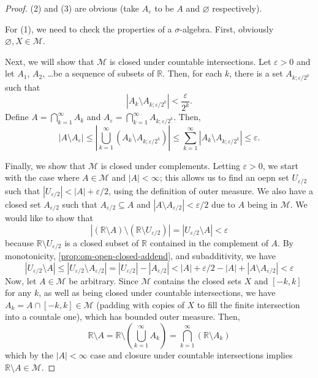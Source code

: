 \documentclass[11pt]{scrartcl}
\providecommand{\eps}{\varepsilon}
\providecommand{\RR}{\mathbb R}
\providecommand{\abs}[1]{\left\lvert #1\right\rvert}
\begin{document}
\begin{proof}
    (2) and (3) are obvious (take $A_\eps$ to be $A$ and $\varnothing$ respectively).

    For (1), we need to check the properties of a $\sigma$-algebra.
    First, obviously $\varnothing, X\in\mathcal M$.
    
    Next, we will show that $\mathcal M$ is closed under countable intersections.
    Let $\eps>0$ and let $A_1$, $A_2$, \dots be a sequence of subsets of $\RR$.
    Then, for each $k$, there is a set $A_{k;\eps/2^k}$ such that
    \begin{equation*}
	\abs{A_k\setminus A_{k;\eps/2^k}} < \frac\eps{2^k}.
    \end{equation*}
    Define $A = \bigcap_{k=1}^\infty A_k$ and
    $A_\eps=\bigcap_{k=1}^\infty A_{k;\eps/2^k}$. Then,
    \begin{equation*}
	\abs{A\setminus A_\eps}
	\le \abs{\bigcup_{k=1}^\infty (A_k\setminus A_{k;\eps/2^k})} \le
	\sum_{k=1}^\infty\abs{A_k\setminus A_{k;\eps/2^k}}\le\eps.
    \end{equation*}

    Finally, we show that $\mathcal M$ is closed under complements.
    Letting $\eps > 0$, we start with the case where $A\in\mathcal M$
    and $\abs A < \infty$; this allows us to find an oepn set
    $U_{\eps/2}$ such that $\abs{U_{\eps/2}} < \abs A + \eps/2$,
    using the definition of outer measure.
    We also have a closed set $A_{\eps/2}$ such that
    $A_{\eps/2}\subseteq A$ and $\abs{A\setminus A_{\eps/2}} < \eps/2$
    due to $A$ being in $\mathcal M$. We would like to show that
    \begin{equation*}
	\abs{(\RR\setminus A)\setminus(\RR\setminus U_{\eps/2})}
	= \abs{U_{\eps/2}\setminus A} < \eps
    \end{equation*}
    because $\RR\setminus U_{\eps/2}$ is a closed subset of $\RR$
    contained in the complement of $A$.
    By monotonicity, \autoref{prop:om-open-closed-addend},
    and subadditivity, we have
    \begin{equation*}
	\abs{U_{\eps/2}\setminus A} \le
	\abs{U_{\eps/2}\setminus A_{\eps/2}} =
	\abs{U_{\eps/2}}-\abs{A_{\eps/2}} <
	\abs A + \eps/2 - \abs A + \abs{A\setminus A_{\eps/2}} < \eps
    \end{equation*}
    Now, let $A\in\mathcal M$ be arbitrary.
    Since $\mathcal M$ contains the closed sets $X$ and $[-k,k]$
    for any $k$, as well as being closed under countable intersections,
    we have $A_k = A\cap[-k,k]\in\mathcal M$
    (padding with copies of $X$ to fill
    the finite intersection into a countale one),
    which has bounded outer measure. Then,
    \begin{equation*}
	\RR\setminus A = \RR\setminus\left(\bigcup_{k=1}^\infty A_k\right) =
    \bigcap_{k=1}^\infty(\RR\setminus A_k)
    \end{equation*}
    which by the $\abs A < \infty$ case and closure under countable intersections
    implies $\RR\setminus A\in\mathcal M$.
\end{proof}
\end{document}

